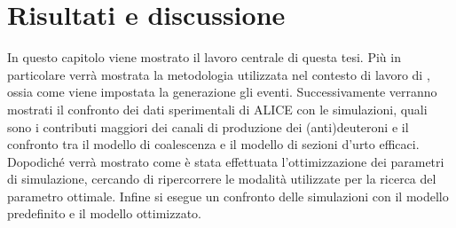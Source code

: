 \chapter{Risultati e discussione}\label{ch:risultati}

In questo capitolo viene mostrato il lavoro centrale di questa tesi. Più in particolare verrà mostrata la metodologia utilizzata nel contesto di lavoro di , ossia come  viene impostata la generazione gli eventi.
Successivamente verranno mostrati il confronto dei dati sperimentali di ALICE con le simulazioni, quali sono i contributi maggiori dei canali di produzione dei (anti)deuteroni e il confronto tra il modello di coalescenza e il modello di sezioni d'urto efficaci.
Dopodiché verrà mostrato come è stata effettuata l'ottimizzazione dei parametri di simulazione, cercando di ripercorrere le modalità utilizzate per la ricerca del parametro ottimale.
Infine si esegue un confronto delle simulazioni con il modello predefinito e il modello ottimizzato.






